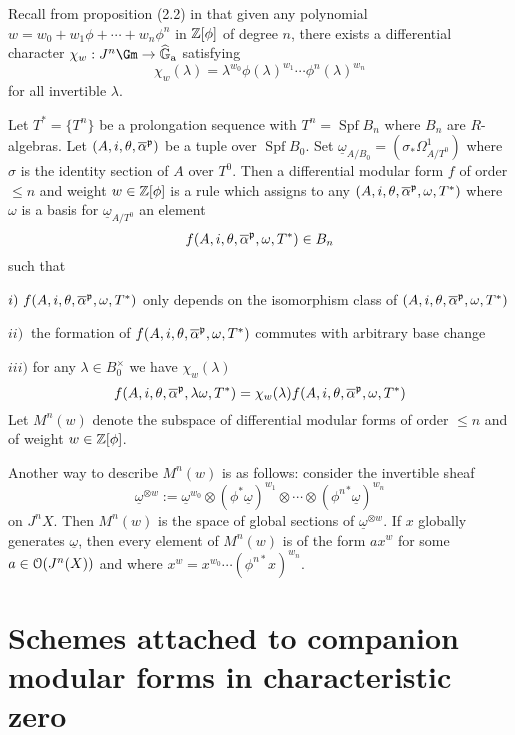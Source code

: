 \documentclass{amsart}
\def \hG{\widehat{\mathbb{G}}_{\mathrm{a}}}
\newcommand{\uomega}{\underline{\omega}}
\newcommand{\ov}[1]{\overline{#1}}
\numberwithin{equation}{section}
\DeclareMathOperator{\Spf}{\mathrm{Spf}}
\begin{document}
Recall from proposition (2.2) in \cite{MR2400054} that given any polynomial 
$w=w_0 + w_1 \phi + \cdots + w_n \phi^n$ in $\mathbb{Z}[\phi]$ of 
degree $n$, there exists a differential character $\chi_w: J^n\Gm \map \hG$
satisfying 
$$
\chi_w(\lambda) = \lambda^{w_0} \phi(\lambda)^{w_1} \cdots \phi^n(\lambda)^{w_n}
$$ 
for all invertible $\lambda$. 

Let $T^*=\{T^n\}$ be a prolongation sequence with $T^n = \Spf B_n$ where 
$B_n$ are $R$-algebras. Let $(A,i, \theta, \ov{\alpha}^\gp)$ be a tuple 
over $\Spf B_0$. Set $\uomega_{A/B_0} = 
\left(\sigma_* \Omega^1_{A/T^0}\right)$ where $\sigma$ is the identity
section of $A$ over $T^0$.
Then a differential modular form $f$ of order $\leq n$
and weight $w \in \mathbb{Z}[\phi]$ is a rule which assigns to any 
$(A,i, \theta, \ov{\alpha}^\gp,\omega, T^*)$ where $\omega$ is a 
basis for $\uomega_{A/T^0}$ an element 
$$f(A,i, \theta, \ov{\alpha}^\gp,\omega, T^*) \in B_n$$ 
such that 

$i)~ f(A,i, \theta, \ov{\alpha}^\gp,\omega, T^*)$ only depends on the 
isomorphism class of $(A,i, \theta, \ov{\alpha}^\gp,\omega, T^*)$

$ii)~$ the formation of $f(A,i, \theta, \ov{\alpha}^\gp,\omega, T^*)$ 
commutes with arbitrary base change

$iii)$ for any $\lambda \in B_0^\times$ we have $\chi_w(\lambda)$
$$
f(A,i, \theta, \ov{\alpha}^\gp,\lambda\omega, T^*) = \chi_w(\lambda)
f(A,i, \theta, \ov{\alpha}^\gp,\omega, T^*)
$$
Let $M^n(w)$ denote the subspace of differential
modular forms of order $\leq n$ and of weight $w \in \mathbb{Z}[\phi]$. 

Another way to describe $M^n(w)$ is as follows: consider the invertible sheaf
$$\uomega^{\otimes w} := \uomega^{w_0} \otimes (\phi^*\uomega)^{w_1} \otimes
\cdots \otimes ({\phi^n}^*\uomega)^{w_n}
$$
on $J^nX$. Then $M^n(w)$ is the space of global sections of $\uomega^{\otimes w}
$.
If $x$ globally generates $\underline{\omega}$, then 
every element of $M^n(w)$ is of the form $a x^w$ for some $a \in \mathcal{O}(J^n(X))$
and where $x^w= x^{w_0} \cdots (\phi^{n *}x)^{w_n}$. 

\section{Schemes attached to companion modular forms in characteristic zero}




\end{document}
